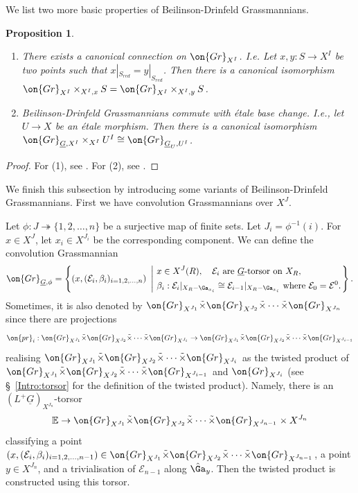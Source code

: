 \documentclass[]{pcmi}
\theoremstyle{plain}
\newtheorem{prop}[equation]{Proposition}
\theoremstyle{remark}
\theoremstyle{definition}
\newcommand{\bE}{{\mathbb E}}
\newcommand{\mE}{{\mathcal E}}
\newcommand{\Gr}{{\on{Gr}}}
\newcommand{\pr}{{\on{pr}}}
\begin{document}
We list two more basic properties of Beilinson-Drinfeld Grassmannians.
\begin{prop}\label{III:property}~
\begin{enumerate}
\item There exists a canonical connection on $\Gr_{X^I}$. I.e. Let $x,y:S\to X^I$ be two points such that $x|_{S_{red}}=y|_{S_{red}}$. Then there is a canonical isomorphism $\Gr_{X^I}\times_{X^I,x}S=\Gr_{X^I}\times_{X^I,y}S$.

\item Beilinson-Drinfeld Grassmannians commute with \'etale base change. I.e., let $U\to X$ be an \'etale morphism. Then there is a canonical isomorphism $\Gr_{\underline G,X^I}\times_{X^I}U^I\cong\Gr_{\underline G_U, U^I}$.
\end{enumerate}
\end{prop}
\begin{proof} For (1), see \cite[\S 2.8]{BD}.
For (2), see \cite[Lemma 3.2]{Z10}.
\end{proof}

We finish this subsection by introducing some variants of Beilinson-Drinfeld Grassmannians. 
First we have  convolution Grassmannians over $X^J$. 

Let $\phi:J\twoheadrightarrow \{1,2,\ldots,n\}$ be a surjective map of finite sets. Let $J_i=\phi^{-1}(i)$. For $x\in X^J$, let $x_i\in X^{J_i}$ be the corresponding component.
We can define the convolution Grassmannian
\begin{equation}\label{III:conv}
\Gr_{\underline G, \phi}=\left\{(x,(\mE_{i},\beta_i)_{i=1,2,\ldots,n})\ \left|\ \begin{split}&x\in X^J(R),\quad \mE_i \mbox{ are } \underline{G}\mbox{-torsor on } X_R, \\
& \beta_i: \mE_{i}|_{X_R-\Ga_{x_i}}\cong \mE_{i-1}|_{X_R-\Ga_{x_i}} \mbox{ where } \mE_0=\mE^0.\end{split}\right.\right\}.
\end{equation}
Sometimes, it is also denoted by $\Gr_{X^{J_1}}\tilde\times\Gr_{X^{J_2}}\tilde\times\cdots\tilde\times\Gr_{X^{J_n}}$ since there are projections
\[\pr_i:\Gr_{X^{J_1}}\tilde\times\Gr_{X^{J_2}}\tilde\times\cdots\tilde\times\Gr_{X^{J_i}}\to \Gr_{X^{J_1}}\tilde\times\Gr_{X^{J_2}}\tilde\times\cdots\tilde\times\Gr_{X^{J_{i-1}}}\]
realising $\Gr_{X^{J_1}}\tilde\times\Gr_{X^{J_2}}\tilde\times\cdots\tilde\times\Gr_{X^{J_i}}$ as the twisted product of $\Gr_{X^{J_1}}\tilde\times\Gr_{X^{J_2}}\tilde\times\cdots\tilde\times\Gr_{X^{J_{i-1}}}$ and $\Gr_{X^{J_i}}$ (see \S\ \ref{Intro:torsor} for the definition of the twisted product). Namely, there is an $(L^+\underline G)_{X^{J_n}}$-torsor  
\begin{equation}\label{torsor E}
\bE\to \Gr_{X^{J_1}}\tilde\times\Gr_{X^{J_2}}\tilde\times\cdots\tilde\times\Gr_{X^{J_{n-1}}}\times X^{J_n}
\end{equation} classifying a point $(x,(\mE_{i},\beta_i)_{i=1,2,\ldots,n-1})\in \Gr_{X^{J_1}}\tilde\times\Gr_{X^{J_2}}\tilde\times\cdots\tilde\times\Gr_{X^{J_{n-1}}}$, a point $y\in X^{J_n}$, and a trivialisation of $\mE_{n-1}$ along $\hat{\Ga}_y$. Then the twisted product is constructed using this torsor. 
\end{document}
